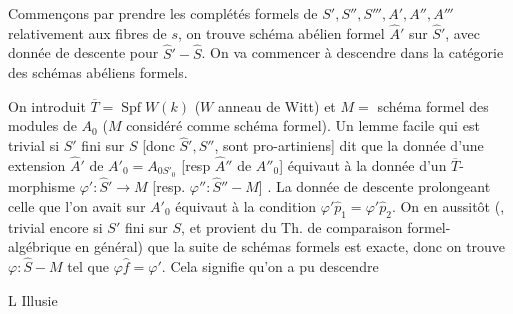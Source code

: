 Commençons par prendre les complétés formels de $S',S'',S''',A',A'',A'''$  relativement aux fibres de $s$, on trouve  schéma abélien formel $\widehat A'$ sur $\widehat S'$, avec donnée de descente pour $\widehat S'\mathbin{-}\widehat S$. On va commencer à descendre dans la catégorie des schémas abéliens formels.

On introduit $\overline T=\operatorname{Spf}W(k)$ ($W$ anneau de Witt) et $M=$ schéma formel des modules de $A_0$ ($M$ considéré comme schéma formel). Un lemme facile qui est  trivial si $S'$ fini sur $S$ [donc $\widehat S',\widehat S''$,  sont pro-artiniens] dit que la donnée d'une extension  $\widehat A'$ de $A'_0=A_{0S'_0}$ [resp $\widehat A''$ de $A''_0$] équivaut à la donnée d'un $\overline T$-morphisme $\varphi':\widehat S'\longrightarrow M$ [resp. $\varphi'':\widehat S''\mathbin{-}M$] \deleted{\unsure{resp.} $\widehat S'''\mathbin{-}M$]}.
La donnée de descente  prolongeant celle que l'on avait sur $A'_0$ équivaut à la condition $\varphi'\widehat p_1=\varphi'\widehat p_2$. On en  aussitôt (, trivial encore si $S'$ fini sur $S$, et provient du Th. de comparaison formel-algébrique en général) que la suite
de schémas formels est exacte, donc on trouve $\varphi:\widehat S\mathbin{-}M$ tel que $\varphi\widehat f=\varphi'$. Cela signifie qu'on a pu descendre

\begin{flushright}L Illusie\end{flushright}

